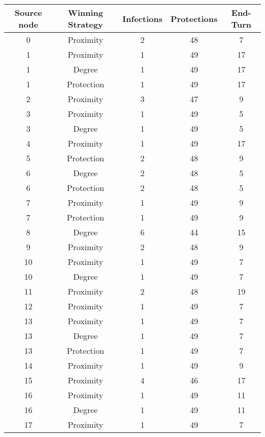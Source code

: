 \documentclass[results.tex]{subfiles}
\begin{document}
\begin{center}
  \begin{tabular}{| c || c | c | c | c |}
    \hline
    {\bfseries Source node} & {\bfseries Winning Strategy} & {\bfseries Infections} & {\bfseries Protections} & {\bfseries End-Turn} \\  %
    \hline\hline
    0 & Proximity & 2 & 48 & 7 \\ 
    \hline
    1 & Proximity & 1 & 49 & 17 \\ 
    \hline
    1 & Degree & 1 & 49 & 17 \\ 
    \hline
    1 & Protection & 1 & 49 & 17 \\ 
    \hline
    2 & Proximity & 3 & 47 & 9 \\ 
    \hline
    3 & Proximity & 1 & 49 & 5 \\ 
    \hline
    3 & Degree & 1 & 49 & 5 \\ 
    \hline
    4 & Proximity & 1 & 49 & 17 \\ 
    \hline
    5 & Protection & 2 & 48 & 9 \\ 
    \hline
    6 & Degree & 2 & 48 & 5 \\ 
    \hline
    6 & Protection & 2 & 48 & 5 \\ 
    \hline
    7 & Proximity & 1 & 49 & 9 \\ 
    \hline
    7 & Protection & 1 & 49 & 9 \\ 
    \hline
    8 & Degree & 6 & 44 & 15 \\ 
    \hline
    9 & Proximity & 2 & 48 & 9 \\ 
    \hline
    10 & Proximity & 1 & 49 & 7 \\ 
    \hline
    10 & Degree & 1 & 49 & 7 \\ 
    \hline
    11 & Proximity & 2 & 48 & 19 \\ 
    \hline
    12 & Proximity & 1 & 49 & 7 \\ 
    \hline
    13 & Proximity & 1 & 49 & 7 \\ 
    \hline
    13 & Degree & 1 & 49 & 7 \\ 
    \hline
    13 & Protection & 1 & 49 & 7 \\ 
    \hline
    14 & Proximity & 1 & 49 & 9 \\ 
    \hline
    15 & Proximity & 4 & 46 & 17 \\ 
    \hline
    16 & Proximity & 1 & 49 & 11 \\ 
    \hline
    16 & Degree & 1 & 49 & 11 \\ 
    \hline
    17 & Proximity & 1 & 49 & 7 \\ 

\end{tabular}
\end{center}
\end{document}
